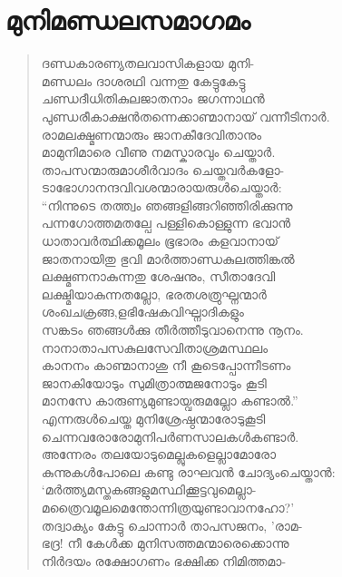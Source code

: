 \section{മുനിമണ്ഡലസമാഗമം}

\begin{verse}
ദണ്ഡകാരണ്യതലവാസികളായ മുനി-\\
മണ്ഡലം ദാശരഥി വന്നതു കേട്ടുകേട്ടു\\
ചണ്ഡദീധിതികുലജാതനാം ജഗന്നാഥന്‍\\
പുണ്ഡരീകാക്ഷന്‍തന്നെക്കാണ്മാനായ് വന്നീടിനാര്‍.\\
രാമലക്ഷ്മണന്മാരും ജാനകീദേവിതാനും\\
മാമുനിമാരെ വീണു നമസ്കാരവും ചെയ്താര്‍.\\
താപസന്മാരുമാശീര്‍വാദം ചെയ്തവര്‍കളോ-\\
ടാഭോഗാനന്ദവിവശന്മാരായരുള്‍ചെയ്താര്‍:\\
“നിന്നുടെ തത്ത്വം ഞങ്ങളിങ്ങറിഞ്ഞിരിക്കുന്നു\\
പന്നഗോത്തമതല്പേ പള്ളികൊള്ളുന്ന ഭവാന്‍\\
ധാതാവര്‍ത്ഥിക്കമൂലം ഭൂഭാരം കളവാനായ്\\
ജാതനായിതു ഭുവി മാര്‍ത്താണ്ഡകുലത്തിങ്കല്‍\\
ലക്ഷ്മണനാകുന്നതു ശേഷനും, സീതാദേവി\\
ലക്ഷ്മിയാകുന്നതല്ലോ, ഭരതശത്രുഘ്നന്മാര്‍\\
ശംഖചക്രങ്ങ,ളഭിഷേകവിഘ്നാദികളും\\
സങ്കടം ഞങ്ങള്‍ക്കു തീര്‍ത്തീടുവാനെന്നു നൂനം.\\
നാനാതാപസകുലസേവിതാശ്രമസ്ഥലം\\
കാനനം കാണ്മാനാശു നീ കൂടെപ്പോന്നീടണം\\
ജാനകിയോടും സുമിത്രാത്മജനോടും കൂടി\\
മാനസേ കാരുണ്യമുണ്ടായ്വരുമല്ലോ കണ്ടാല്‍.”\\
എന്നരുള്‍ചെയ്ത മുനിശ്രേഷ്ഠന്മാരോടുകൂടി\\
ചെന്നവരോരോമുനിപര്‍ണസാലകള്‍കണ്ടാര്‍.\\
അന്നേരം തലയോടുമെല്ലുകളെല്ലാമോരോ\\
കുന്നുകള്‍പോലെ കണ്ടു രാഘവന്‍ ചോദ്യംചെയ്താന്‍:\\
‘മര്‍ത്ത്യമസ്തകങ്ങളുമസ്ഥിക്കൂട്ടവുമെല്ലാ-\\
മത്രൈവമൂലമെന്തോന്നിത്രയുണ്ടാവാനഹോ?’\\
തദ്വാക്യം കേട്ടു ചൊന്നാര്‍ താപസജനം, ’രാമ-\\
ഭദ്ര! നീ കേള്‍ക്ക മുനിസത്തമന്മാരെക്കൊന്നു\\
നിര്‍ദയം രക്ഷോഗണം ഭക്ഷിക്ക നിമിത്തമാ-\\

\end{verse}
